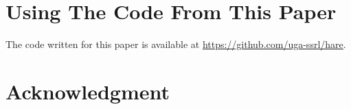 \appendices
\section{Using The Code From This Paper}        %
The code written for this paper is available at
\url{https://github.com/uga-ssrl/hare}.

\section*{Acknowledgment}
